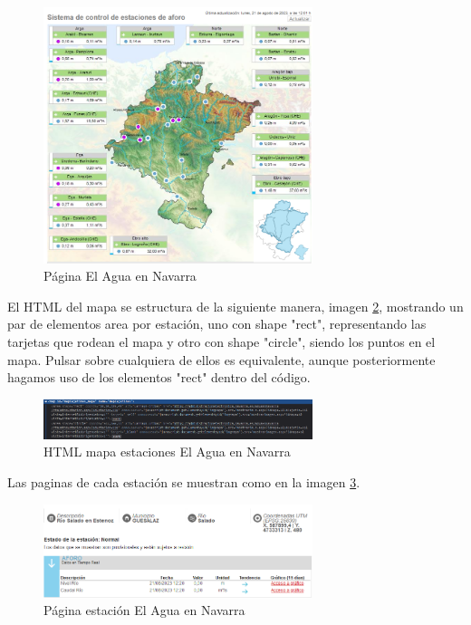 \begin{figure} [H]
	\centering
	\includegraphics[width=0.7\textwidth]{fig/AguaEnNavarraCode.png}
	\caption[Página principal de aforos de El Agua en Navarra]{Página El Agua en Navarra}
	\label{fig:ej4}
\end{figure}

El HTML del mapa se estructura de la siguiente manera, imagen \ref{fig:ej22}, mostrando un par de elementos area por estación, uno con shape "rect", representando las tarjetas que rodean el mapa y otro con shape "circle", siendo los puntos en el mapa. Pulsar sobre cualquiera de ellos es equivalente, aunque posteriormente hagamos uso de los elementos "rect" dentro del código.

\begin{figure} [H]
	\centering
	\includegraphics[width=0.7\textwidth]{fig/AguaEnNavarraCodeHTML.png}
	\caption[HTML mapa estaciones de El Agua en Navarra]{HTML mapa estaciones El Agua en Navarra}
	\label{fig:ej22}
\end{figure}

Las paginas de cada estación se muestran como en la imagen \ref{fig:ej23}.

\begin{figure} [H]
	\centering
	\includegraphics[width=0.7\textwidth]{fig/AguaEnNavarraEstacion.png}
	\caption[Página estación de El Agua en Navarra]{Página estación El Agua en Navarra}
	\label{fig:ej23}
\end{figure}

